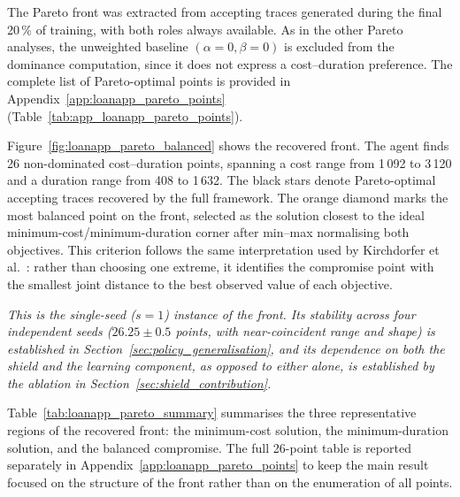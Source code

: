 The Pareto front was extracted from accepting traces generated during
the final 20\,\% of training, with both roles always available. As in
the other Pareto analyses, the unweighted baseline $(\alpha=0,\beta=0)$
is excluded from the dominance computation, since it does not express a
cost--duration preference. The complete list of Pareto-optimal points is
provided in Appendix~\ref{app:loanapp_pareto_points}
(Table~\ref{tab:app_loanapp_pareto_points}).

Figure~\ref{fig:loanapp_pareto_balanced} shows the recovered front. The
agent finds 26 non-dominated cost--duration points, spanning a cost
range from 1\,092 to 3\,120 and a duration range from 408 to 1\,632.
The black stars denote Pareto-optimal accepting traces recovered by the
full framework. The orange diamond marks the most balanced point on the
front, selected as the solution closest to the ideal
minimum-cost/minimum-duration corner after min--max normalising both
objectives. This criterion follows the same interpretation used by
Kirchdorfer et al.~\cite{KirchdorferLukasFromPolicies}: rather than
choosing one extreme, it identifies the compromise point with the
smallest joint distance to the best observed value of each objective.

\textit{This is the single-seed (\(s=1\)) instance of the front. Its
stability across four independent seeds (\(26.25 \pm 0.5\) points, with
near-coincident range and shape) is established in
Section~\ref{sec:policy_generalisation}, and its dependence on both the
shield and the learning component, as opposed to either alone, is
established by the ablation in Section~\ref{sec:shield_contribution}.}

Table~\ref{tab:loanapp_pareto_summary} summarises the three
representative regions of the recovered front: the minimum-cost
solution, the minimum-duration solution, and the balanced compromise.
The full 26-point table is reported separately in
Appendix~\ref{app:loanapp_pareto_points} to keep the main result
focused on the structure of the front rather than on the enumeration of
all points.

